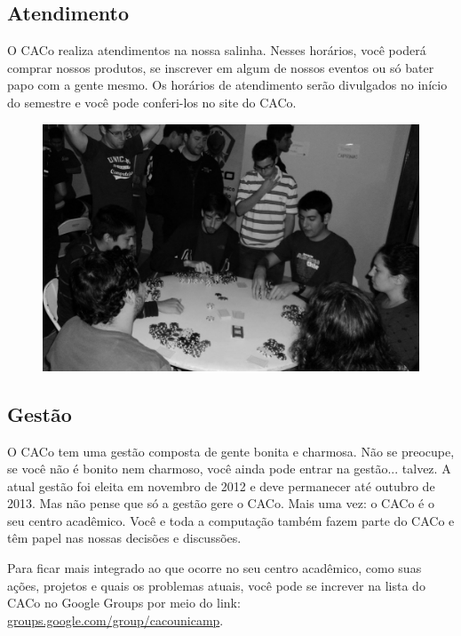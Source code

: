 \subsection{Atendimento}

O CACo realiza atendimentos na nossa salinha. Nesses horários, você poderá
comprar nossos produtos, se inscrever em algum de nossos eventos ou só bater papo
com a gente mesmo. Os horários de atendimento serão divulgados no início do
semestre e você pode conferi-los no site do CACo.

\begin{figure}[H]
    \centering
    \includegraphics[scale=0.21]{img/caco/poker.jpg}
\end{figure}

\subsection{Gestão}

O CACo tem uma gestão composta de gente bonita e charmosa. Não se preocupe, se
você não é bonito nem charmoso, você ainda pode entrar na gestão... talvez. A
atual gestão foi eleita em novembro de 2012 e deve permanecer até outubro de
2013. Mas não pense que só a gestão gere o CACo. Mais uma vez: o CACo é o seu
centro acadêmico. Você e toda a computação também fazem parte do CACo e têm papel
nas nossas decisões e discussões.

Para ficar mais integrado ao que ocorre no seu centro acadêmico, como suas
ações, projetos e quais os problemas atuais, você pode se increver na lista do
CACo no Google Groups por meio do link:
\url{groups.google.com/group/cacounicamp}.

